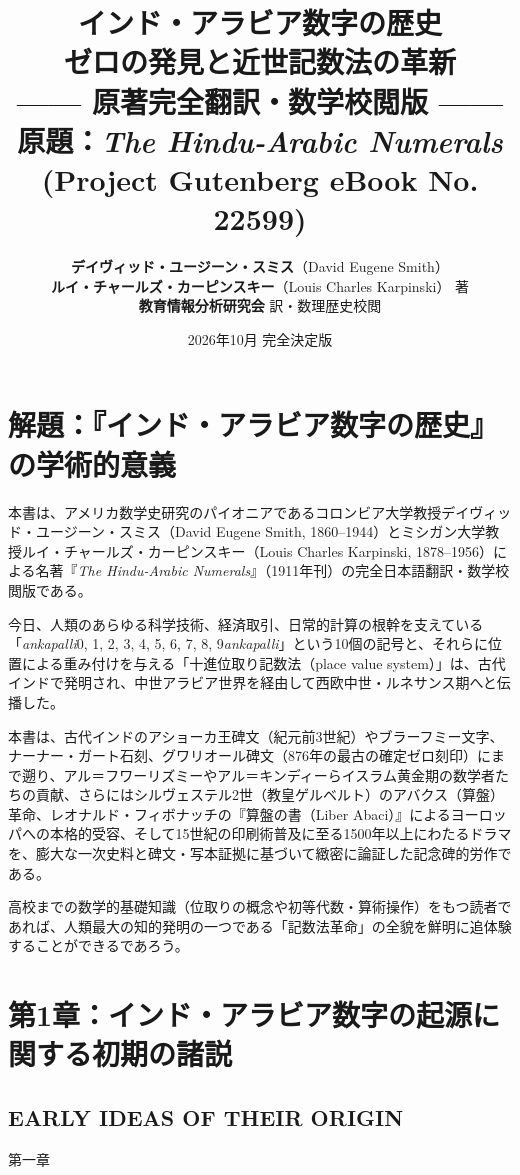 \documentclass[a4paper,11pt,openany]{ltjsbook}
\title{
    {\huge\bfseries\gtfamily インド・アラビア数字の歴史}\\[14pt]
    {\Large ゼロの発見と近世記数法の革新}\\[8pt]
    {\large —— 原著完全翻訳・数学校閲版 ——}\\[16pt]
    {\normalsize 原題：\textit{The Hindu-Arabic Numerals} (Project Gutenberg eBook No. 22599)}
}
\author{
    \textbf{デイヴィッド・ユージーン・スミス}（David Eugene Smith）\\
    \textbf{ルイ・チャールズ・カーピンスキー}（Louis Charles Karpinski） 著\\[12pt]
    \textbf{教育情報分析研究会} 訳・数理歴史校閲
}
\date{2026年10月 完全決定版}
\begin{document}
\maketitle
\frontmatter
\tableofcontents
\clearpage

\chapter*{解題：『インド・アラビア数字の歴史』の学術的意義}

本書は、アメリカ数学史研究のパイオニアであるコロンビア大学教授デイヴィッド・ユージーン・スミス（David Eugene Smith, 1860--1944）とミシガン大学教授ルイ・チャールズ・カーピンスキー（Louis Charles Karpinski, 1878--1956）による名著『\textit{The Hindu-Arabic Numerals}』（1911年刊）の完全日本語翻訳・数学校閲版である。

今日、人類のあらゆる科学技術、経済取引、日常的計算の根幹を支えている「\textit{ankapalli}0, 1, 2, 3, 4, 5, 6, 7, 8, 9\textit{ankapalli}」という10個の記号と、それらに位置による重み付けを与える「十進位取り記数法（place value system）」は、古代インドで発明され、中世アラビア世界を経由して西欧中世・ルネサンス期へと伝播した。

本書は、古代インドのアショーカ王碑文（紀元前3世紀）やブラーフミー文字、ナーナー・ガート石刻、グワリオール碑文（876年の最古の確定ゼロ刻印）にまで遡り、アル＝フワーリズミーやアル＝キンディーらイスラム黄金期の数学者たちの貢献、さらにはシルヴェステル2世（教皇ゲルベルト）のアバクス（算盤）革命、レオナルド・フィボナッチの『算盤の書（Liber Abaci）』によるヨーロッパへの本格的受容、そして15世紀の印刷術普及に至る1500年以上にわたるドラマを、膨大な一次史料と碑文・写本証拠に基づいて緻密に論証した記念碑的労作である。

高校までの数学的基礎知識（位取りの概念や初等代数・算術操作）をもつ読者であれば、人類最大の知的発明の一つである「記数法革命」の全貌を鮮明に追体験することができるであろう。

\clearpage
\mainmatter
\chapter{第1章：インド・アラビア数字の起源に関する初期の諸説}
\section*{EARLY IDEAS OF THEIR ORIGIN}

第一章
\end{document}
